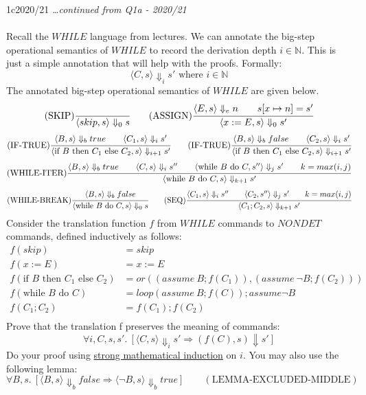 \begin{exambox}{1c}{2020/21}
	\textit{\dots continued from Q1a - 2020/21}
	\\
	\\ Recall the $WHILE$ language from lectures. We can annotate the big-step
	operational semantics of $WHILE$ to record the derivation depth $i \in \mathbb{N}$. This is
	just a simple annotation that will help with the proofs. Formally:
	\[\langle C, s \rangle \Downarrow_i s' \text{ where } i \in \mathbb{N}\]
	The annotated big-step operational semantics of $WHILE$ are given below.
	\[(\text{SKIP}) \cfrac{}{\langle skip, s \rangle \Downarrow_0 s} \qquad (\text{ASSIGN}) \cfrac{\langle E, s \rangle \Downarrow_e n \qquad s[x \mapsto n] = s'}{\langle x := E, s \rangle \Downarrow_0 s'}\]
	\[(\text{IF-TRUE}) \cfrac{\langle B, s \rangle \Downarrow_b true \qquad \langle C_1, s \rangle \Downarrow_i s'}{\langle \text{if } B \text{ then } C_1 \text{ else } C_2 , s \rangle \Downarrow_{i+1} s'} \qquad (\text{IF-TRUE}) \cfrac{\langle B, s \rangle \Downarrow_b false \qquad \langle C_2, s \rangle \Downarrow_i s'}{\langle \text{if } B \text{ then } C_1 \text{ else } C_2 , s \rangle \Downarrow_{i+1} s'}\]
	\[(\text{WHILE-ITER}) \cfrac{\langle B, s \rangle \Downarrow_b true \qquad \langle C, s \rangle \Downarrow_i s'' \qquad \langle \text{while } B \text{ do } C, s''\rangle \Downarrow_j s' \qquad k = max(i,j)}{\langle \text{while } B \text{ do } C, s \rangle \Downarrow_{k+1} s'}\]
	\[(\text{WHILE-BREAK}) \cfrac{\langle B, s \rangle \Downarrow_b false}{\langle \text{while } B \text{ do } C, s \rangle \Downarrow_0 s} \qquad (\text{SEQ}) \cfrac{\langle C_1, s \rangle \Downarrow_i s'' \qquad \langle C_2, s'' \rangle \Downarrow_j s' \qquad k = max(i,j)}{\langle C_1 ; C_2, s \rangle \Downarrow_{k+1} s'}\]
	Consider the translation function $f$ from $WHILE$ commands to $NONDET$
	commands, defined inductively as follows:
	\[\begin{split}
		f(skip) & = skip \\
		f(x:= E) & = x := E \\
		f(\text{if } B \text{ then } C_1 \text{ else } C_2) & = or((assume \ B ; f(C_1)), (assume \ \neg B ; f(C_2))) \\
		f(\text{while } B \text{ do } C) &= loop(assume \ B; f(C)); assume \neg B \\
		f(C_1; C_2) & = f(C_1) ; f(C_2) \\ 
	\end{split}\]
	Prove that the translation f preserves the meaning of commands:
	\[\forall i, C, s, s' . \ [\langle C, s \rangle \Downarrow_i s' \Rightarrow (f(C), s) \Downarrow s']\]
	Do your proof using \underline{strong mathematical induction} on $i$. You may also use the following lemma:
	\[\forall B, s . \ [\langle B , s \rangle \Downarrow_b false \Rightarrow \langle \neg B, s \rangle \Downarrow_b true] \qquad (\text{LEMMA-EXCLUDED-MIDDLE})\]
\end{exambox}


